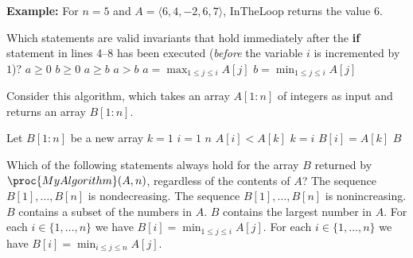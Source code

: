 {\bf Example:} For $n=5$ and $A = \langle 6, 4, -2, 6, 7\rangle$, {\sc InTheLoop} returns the value $6$.
\medskip

\noindent
Which statements are valid invariants that hold immediately after the {\bf if} statement in lines 4--8 has been executed (\emph{before} the variable $i$ is incremented by $1$)?
\multipleanswers
\optionsstart
\answer $a\geq 0$
\answer $b\geq 0$
\answer $a\geq b$ \correct
\answer $a > b$
\answer $a = \max_{1\leq j \leq i} A[j]$ \correct
\answer $b = \min_{1\leq j \leq i} A[j]$
\optionsend




Consider this algorithm, which takes an array $A[1:n]$ of integers as input and returns an array $B[1:n]$.

\begin{codebox}
  \li Let $B[1:n]$ be a new array
  \li $k=1$
  \li \For $i = 1$ \To $n$
  \li \Do \If $A[i]<A[k]$ \Do
  \li $k=i$
  \End
  \li $B[i]=A[k]$
  \End
  \li \Return $B$
  \End
\end{codebox}

\noindent
Which of the following statements always hold for the array $B$ returned by $\proc{MyAlgorithm}(A, n)$, regardless of the contents of $A$?
\multipleanswers
\optionsstart
\answer The sequence $B[1],\dots,B[n]$ is nondecreasing.
\answer The sequence $B[1],\dots,B[n]$ is nonincreasing.\correct
\answer $B$ contains a subset of the numbers in $A$.\correct
\answer $B$ contains the largest number in $A$.
\answer For each $i\in\{1,\ldots,n\}$ we have $B[i]=\min_{1\leq j\leq i} A[j]$.\correct
\answer For each $i\in\{1,\ldots,n\}$ we have $B[i]=\min_{i\leq j\leq n} A[j]$.

\optionsend
{}



